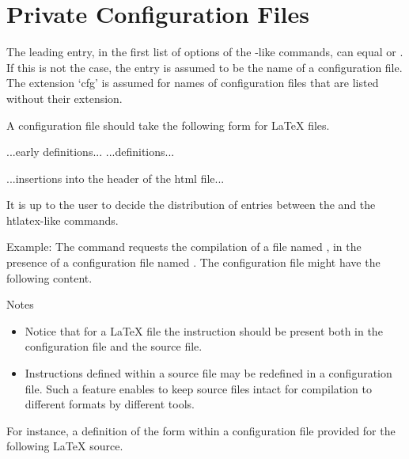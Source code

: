 \section{Private Configuration Files}\label{sec:private-configuration}

The leading entry, in the first list of options of the -like
commands, can equal  or . If this is not the case,
the entry is assumed to be the name of a configuration file. The extension
‘cfg’ is assumed for names of configuration files that are listed without their
extension.

A configuration file should take the following form for LaTeX files.

\begin{texsource}
...early definitions...
...definitions...

...insertions into the header of the html file...
\EndPreamble
\end{texsource}

It is up to the user to decide the distribution of entries between the \texcommand{\Preamble} and the htlatex-like commands.

Example: The command  requests the
compilation of a file named , in the presence of a
configuration file named . The configuration file might have the
following content.

\begin{texsource}
 
\EndPreamble 
\end{texsource}

Notes

\begin{itemize}
  \item Notice that for a LaTeX file the \texcommand{}
    instruction should be present both in the configuration file and the source
    file.

  \item Instructions defined within a source file may be redefined in a
    configuration file. Such a feature enables to keep source files intact for
    compilation to different formats by different tools.
\end{itemize}

For instance, a definition of the form  within a
configuration file provided for the following LaTeX source.

